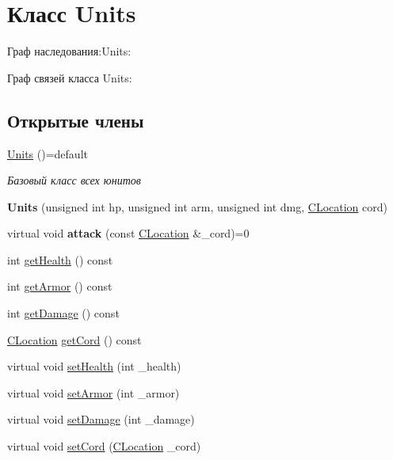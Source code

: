 \hypertarget{classUnits}{}\section{Класс Units}
\label{classUnits}


Граф наследования\+:Units\+:


Граф связей класса Units\+:
\subsection*{Открытые члены}
\begin{DoxyCompactItemize}
\item 
\hyperlink{classUnits_aedcdb8dcf2621240dfb181ef4ff2b4a4}{Units} ()=default
\begin{DoxyCompactList}\small\item\em Базовый класс всех юнитов \end{DoxyCompactList}\item 
{\bfseries Units} (unsigned int hp, unsigned int arm, unsigned int dmg, \hyperlink{classCLocation}{C\+Location} cord)\hypertarget{classUnits_abf8986723d3364bcb5259425dbf46152}{}\label{classUnits_abf8986723d3364bcb5259425dbf46152}

\item 
virtual void {\bfseries attack} (const \hyperlink{classCLocation}{C\+Location} \&\+\_\+cord)=0\hypertarget{classUnits_ac1ebb86fe771681fd69acf4a6484230a}{}\label{classUnits_ac1ebb86fe771681fd69acf4a6484230a}

\item 
int \hyperlink{classUnits_a2610c9872b7aacb0887b981012c6798d}{get\+Health} () const 
\item 
int \hyperlink{classUnits_a1810fc5c570523b525b590347029ab50}{get\+Armor} () const 
\item 
int \hyperlink{classUnits_a99aaacacdbcc72b07d9107dccd39d7eb}{get\+Damage} () const 
\item 
\hyperlink{classCLocation}{C\+Location} \hyperlink{classUnits_a0235abadc69db937f1cd7b14a67a70ee}{get\+Cord} () const 
\item 
virtual void \hyperlink{classUnits_acf0d93407d94e3686c32829454b430a0}{set\+Health} (int \+\_\+health)
\item 
virtual void \hyperlink{classUnits_a4d8f3ac3e7329e010fcd4306afffd7fb}{set\+Armor} (int \+\_\+armor)
\item 
virtual void \hyperlink{classUnits_ae41451cd1f7ce591868eefca03a1a1ab}{set\+Damage} (int \+\_\+damage)
\item 
virtual void \hyperlink{classUnits_a9e57b88f129d7cb7e2099b76f491e820}{set\+Cord} (\hyperlink{classCLocation}{C\+Location} \+\_\+cord)
\end{DoxyCompactItemize}

